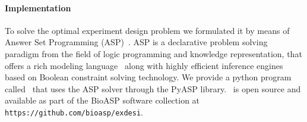 \paragraph*{\bf Implementation}

To solve the optimal experiment design problem we formulated it
by means of Answer Set Programming (ASP)~\cite{baral02a}.
ASP is a declarative problem solving paradigm from the field of logic
programming and knowledge representation, that offers a rich modeling
language~\cite{potasscoManual} along with highly efficient inference
engines~\cite{gekanesc07a} based on Boolean constraint solving technology.
We provide a python program called \expidesi~that uses the ASP solver through
the PyASP library.
\expidesi~is open source and available as part of the BioASP software collection at
\texttt{https://github.com/bioasp/exdesi}.


